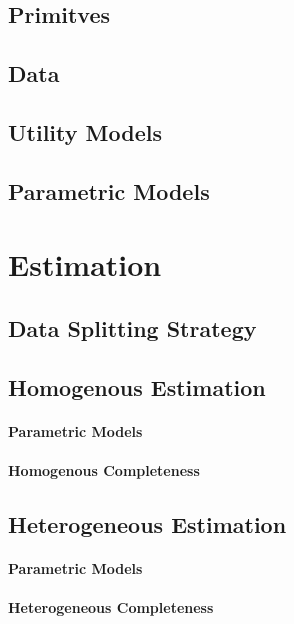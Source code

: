 \documentclass[letterpaper,11pt,leqno]{article}
\begin{document}
\subsection{Primitves}

\subsection{Data}

\subsection{Utility Models}

\subsection{Parametric Models}

\section{Estimation}

\subsection{Data Splitting Strategy}

\subsection{Homogenous Estimation}

\paragraph{Parametric Models}

\paragraph{Homogenous Completeness}

\subsection{Heterogeneous Estimation}

\paragraph{Parametric Models}

\paragraph{Heterogeneous Completeness}
\end{document}
